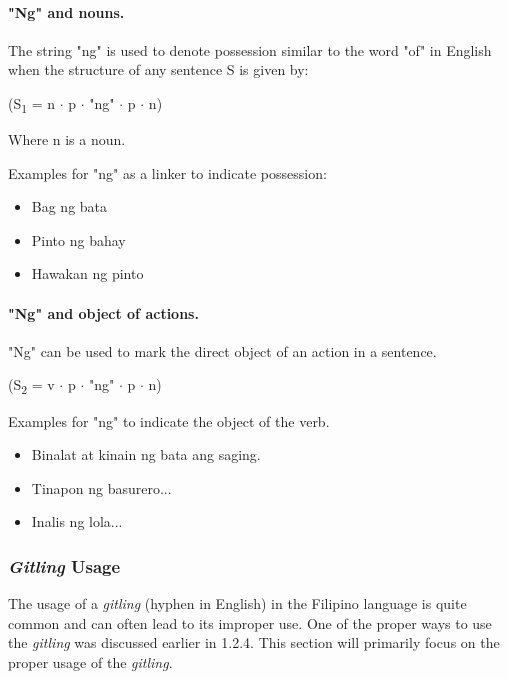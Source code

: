 \paragraph{"Ng" and nouns.} The string "ng" is used to denote possession similar to
the word "of" in English when the structure of any sentence S is given by:

\begin{center}
      (S\textsubscript{1} = n \(\cdot\) p \(\cdot\) "ng" \(\cdot\) p \(\cdot\) n)
\end{center}

Where n is a noun. \\

\begin{example}
      Examples for "ng" as a linker to indicate possession:
\end{example}
\begin{itemize}
      \item Bag ng bata
      \item Pinto ng bahay
      \item Hawakan ng pinto
\end{itemize}

\paragraph{"Ng" and object of actions.}"Ng" can be used to mark the direct object
of an action in a sentence.
\begin{center}
      (S\textsubscript{2} = v \(\cdot\) p \(\cdot\) "ng" \(\cdot\) p \(\cdot\) n)
\end{center}

\begin{example}
      Examples for "ng" to indicate the object of the verb.
\end{example}
\begin{itemize}
      \item Binalat at kinain ng bata ang saging.
      \item Tinapon ng basurero...
      \item Inalis ng lola...
\end{itemize}

\subsubsection{\textit{Gitling} Usage}
The usage of a \textit{gitling} (hyphen in English) in the Filipino language is quite common and can often lead to its improper use. One of the proper ways to use the \textit{gitling} was discussed earlier in 1.2.4. This section will primarily focus on the proper usage of the \textit{gitling}.

